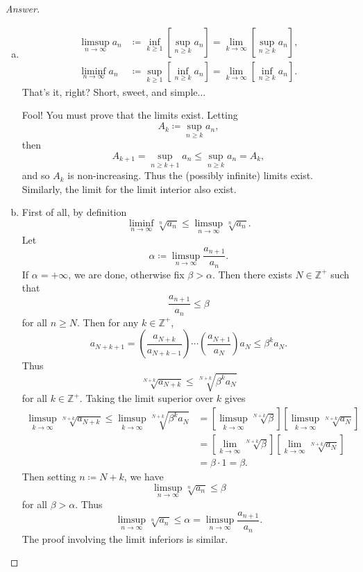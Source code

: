 \documentclass[12pt]{article}
\newcommand{\z}{\mathbb{Z}}
\newcommand\paren[1]{\left( #1 \right)}
\newcommand{\sqbrack}[1]{\left [ #1 \right ]}
\theoremstyle{definition}
\begin{document}
\begin{proof}[Answer]
    \noindent 
    \begin{enumerate}[(a)]
        \item 
        \begin{align*}
            \limsup\limits_{n \to \infty} a_n & \coloneqq \inf\limits_{k \geq 1} \sqbrack{ \sup\limits_{n \geq k} a_n } = \lim\limits_{k \to \infty} \sqbrack{ \sup\limits_{n \geq k} a_n } , \\ 
            \liminf\limits_{n \to \infty} a_n & \coloneqq \sup\limits_{k \geq 1} \sqbrack{ \inf\limits_{n \geq k} a_n } = \lim\limits_{k \to \infty} \sqbrack{ \inf\limits_{n \geq k} a_n } . 
        \end{align*}
        That's it, right? Short, sweet, and simple...
        
        Fool! You must prove that the limits exist. Letting 
        \[
            A_k \coloneqq \sup\limits_{n \geq k} a_n , 
        \]
        then 
        \[
            A_{k+1} = \sup\limits_{n \geq k+1} a_n \leq \sup\limits_{n \geq k} a_n = A_k , 
        \]
        and so $A_k$ is non-increasing. Thus the (possibly infinite) limits exist. Similarly, the limit for the limit interior also exist. 
        \item First of all, by definition 
        \[
            \liminf\limits_{n \to \infty} \sqrt[n]{a_n} \leq \limsup\limits_{n \to \infty} \sqrt[n]{a_n} . 
        \]
        Let 
        \[
            \alpha \coloneqq \limsup\limits_{n \to \infty} \frac{ a_{n+1} }{ a_{n} } . 
        \]
        If $\alpha = +\infty$, we are done, otherwise fix $\beta > \alpha$. Then there exists $N \in \z^+$ such that 
        \[
            \frac{a_{n+1}}{a_{n}} \leq \beta 
        \]
        for all $n \geq N$. Then for any $k \in \z^+$, 
        \[
            a_{N + k + 1} = \paren{ \frac{a_{N+k}}{a_{N+k-1}} } \dotsm \paren{ \frac{a_{N+1}}{a_{N}} } a_N \leq \beta^k a_N . 
        \]
        Thus 
        \[
            \sqrt[N+k]{a_{N+k}} \leq \sqrt[N+k]{ \beta^k a_N }
        \]
        for all $k \in \z^+$. Taking the limit superior over $k$ gives 
        \begin{align*}
            \limsup\limits_{k \to \infty} \sqrt[N+k]{a_{N+k}} \leq \limsup\limits_{k \to \infty} \sqrt[N+k]{ \beta^k a_N } & = \sqbrack{ \limsup\limits_{k \to \infty} \sqrt[N+k]{\beta} } \sqbrack{ \limsup\limits_{k \to \infty} \sqrt[N+k]{a_N} } \\ 
            & = \sqbrack{ \lim\limits_{k \to \infty} \sqrt[N+k]{\beta} } \sqbrack{ \lim\limits_{k \to \infty} \sqrt[N+k]{a_N} } \\ 
            & = \beta \cdot 1 = \beta .
        \end{align*}
        Then setting $n \coloneqq N + k$, we have 
        \[
            \limsup\limits_{n \to \infty} \sqrt[n]{a_n} \leq \beta 
        \]
        for all $\beta > \alpha$. Thus 
        \[
            \limsup\limits_{n \to \infty} \sqrt[n]{a_n} \leq \alpha = \limsup\limits_{n \to \infty} \frac{ a_{n+1} }{a_n} . 
        \]
        The proof involving the limit inferiors is similar. 
    \end{enumerate}
\end{proof}
\end{document}
